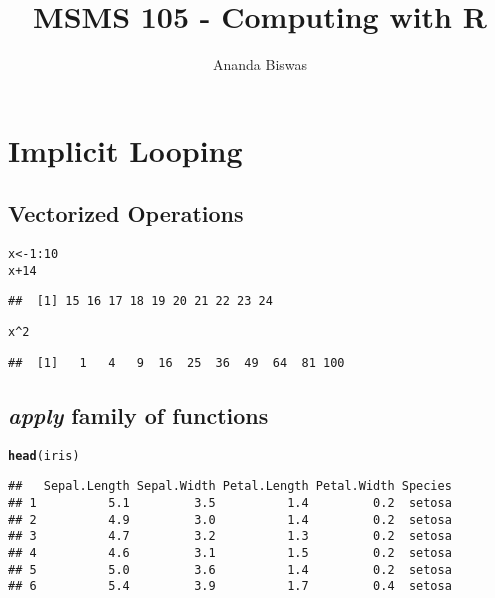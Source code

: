 \documentclass[11pt, a4paper]{article}\usepackage[]{graphicx}\usepackage[]{xcolor}
\title{\textbf{MSMS 105 - Computing with R}}
\author{Ananda Biswas}
\date{}
\makeatletter
\newcommand{\hlnum}[1]{\textcolor[rgb]{0.686,0.059,0.569}{#1}}%
\newcommand{\hlopt}[1]{\textcolor[rgb]{0,0,0}{#1}}%
\newcommand{\hldef}[1]{\textcolor[rgb]{0.345,0.345,0.345}{#1}}%
\newcommand{\hlkwb}[1]{\textcolor[rgb]{0.69,0.353,0.396}{#1}}%
\newcommand{\hlkwd}[1]{\textcolor[rgb]{0.737,0.353,0.396}{\textbf{#1}}}%
\newenvironment{kframe}{%
 \def\at@end@of@kframe{}%
 \ifinner\ifhmode%
  \def\at@end@of@kframe{\end{minipage}}%
  \begin{minipage}{\columnwidth}%
 \fi\fi%
 \def\FrameCommand##1{\hskip\@totalleftmargin \hskip-\fboxsep
 \colorbox{shadecolor}{##1}\hskip-\fboxsep
     \hskip-\linewidth \hskip-\@totalleftmargin \hskip\columnwidth}%
 \MakeFramed {\advance\hsize-\width
   \@totalleftmargin\z@ \linewidth\hsize
   \@setminipage}}%
 {\par\unskip\endMakeFramed%
 \at@end@of@kframe}
\newenvironment{knitrout}{}{} %
\makeatother
\begin{document}
\maketitle

\tableofcontents

\newpage



\section{Implicit Looping}

\subsection{Vectorized Operations}

\begin{knitrout}
\color{fgcolor}\begin{kframe}
\begin{alltt}
\hldef{x} \hlkwb{<-} \hlnum{1}\hlopt{:}\hlnum{10}
\hldef{x} \hlopt{+} \hlnum{14}
\end{alltt}
\begin{verbatim}
##  [1] 15 16 17 18 19 20 21 22 23 24
\end{verbatim}
\begin{alltt}
\hldef{x}\hlopt{^}\hlnum{2}
\end{alltt}
\begin{verbatim}
##  [1]   1   4   9  16  25  36  49  64  81 100
\end{verbatim}
\end{kframe}
\end{knitrout}

\subsection{\textbf{\textit{apply} family of functions}}

\begin{knitrout}
\color{fgcolor}\begin{kframe}
\begin{alltt}
\hlkwd{head}\hldef{(iris)}
\end{alltt}
\begin{verbatim}
##   Sepal.Length Sepal.Width Petal.Length Petal.Width Species
## 1          5.1         3.5          1.4         0.2  setosa
## 2          4.9         3.0          1.4         0.2  setosa
## 3          4.7         3.2          1.3         0.2  setosa
## 4          4.6         3.1          1.5         0.2  setosa
## 5          5.0         3.6          1.4         0.2  setosa
## 6          5.4         3.9          1.7         0.4  setosa
\end{verbatim}
\end{kframe}
\end{knitrout}
\end{document}
